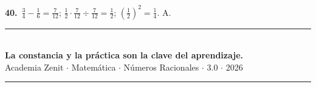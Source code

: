 \documentclass[11pt, letterpaper]{article}
\begin{document}
\textbf{40.}~$\tfrac{3}{4}-\tfrac{1}{6}=\tfrac{7}{12}$; $\tfrac{1}{2}\cdot\tfrac{7}{12}\div\tfrac{7}{12}=\tfrac{1}{2}$; $\left(\tfrac{1}{2}\right)^2=\tfrac{1}{4}$. A.

\vspace{8pt}
\begin{center}
  \rule{\linewidth}{1.5pt}\\[4pt]
  {\large\bfseries\color{zenitnavy} La constancia y la pr\'actica son la clave del aprendizaje.}\\[2pt]
  {\color{zenitgold}\small Academia Zenit $\cdot$ Matem\'atica $\cdot$ N\'umeros Racionales $\cdot$ 3.0 $\cdot$ 2026}\\[4pt]
  \rule{\linewidth}{1.5pt}
\end{center}
\end{document}
